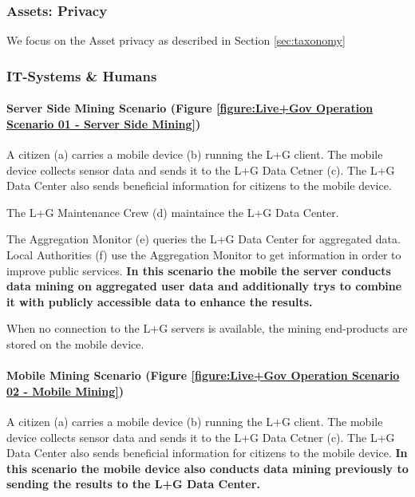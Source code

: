 \subsubsection{Assets: Privacy}

We focus on the Asset privacy as described in Section \ref{sec:taxonomy}


\subsubsection{IT-Systems \& Humans}

\paragraph{Server Side Mining Scenario (Figure \ref{figure:Live+Gov Operation Scenario 01 - Server Side Mining})}




A citizen (a) carries a mobile device (b) running the L+G client. The
mobile device collects sensor data and sends it to the L+G Data Cetner
(c). The L+G Data Center also sends beneficial information for citizens
to the mobile device.

The L+G Maintenance Crew (d) maintaince the L+G Data Center.

The Aggregation Monitor (e) queries the L+G Data Center for aggregated
data. Local Authorities (f) use the Aggregation Monitor to get
information in order to improve public services. \textbf{In this
scenario the mobile the server conducts data mining on aggregated user
data and additionally trys to combine it with publicly accessible data
to enhance the results.}

When no connection to the L+G servers is available, the mining
end-products are stored on the mobile device.

\paragraph{Mobile Mining Scenario (Figure \ref{figure:Live+Gov Operation Scenario 02 - Mobile Mining})}



A citizen (a) carries a mobile device (b) running the L+G client. The
mobile device collects sensor data and sends it to the L+G Data Cetner
(c). The L+G Data Center also sends beneficial information for citizens
to the mobile device. \textbf{In this scenario the mobile device also
conducts data mining previously to sending the results to the L+G Data
Center.}

